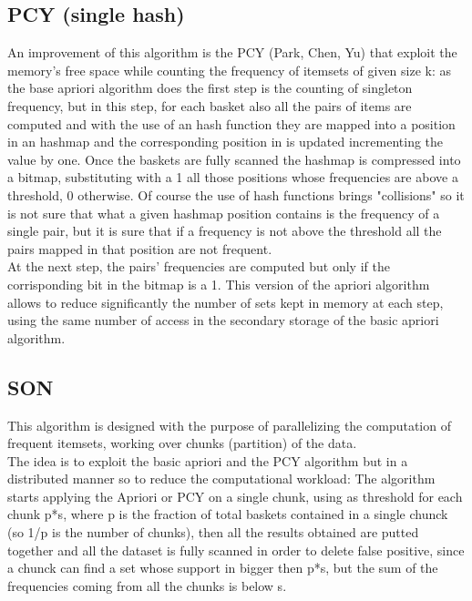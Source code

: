 \documentclass[14pt]{extarticle}
\begin{document}
\subsection{PCY (single hash)}
An improvement of this algorithm is the PCY (Park, Chen, Yu) that exploit the memory's free space while counting the frequency of itemsets of given size k:
as the base apriori algorithm does the first step is the counting of singleton frequency, but in this step, for each basket also all the pairs of items are computed
and with the use of an hash function they are mapped into a position in an hashmap and the corresponding position in is updated incrementing the value by one. Once the baskets are fully scanned the hashmap is compressed into a bitmap, substituting with a 1 all those positions whose frequencies are above a threshold, 0 otherwise. 
Of course the use of hash functions brings "collisions" so it is not sure that what a given hashmap position contains is the frequency of a single pair, but it is sure that if a frequency is not above the threshold all the pairs mapped in that position are not frequent.\\
At the next step, the pairs' frequencies are computed but only if the corrisponding bit in the bitmap is a 1.
This version of the apriori algorithm allows to reduce significantly the number of sets kept in memory at each step, using the same number of access in the secondary storage of the basic apriori algorithm.
 
\subsection{SON}
This algorithm is designed with the purpose of parallelizing the computation of frequent itemsets, working over chunks (partition) of the data.\\
The idea is to exploit the basic apriori and the PCY algorithm but in a distributed manner so to reduce the computational workload:
The algorithm starts applying the Apriori or PCY on a single chunk, using as threshold for each chunk p*s, where p is the fraction of total baskets contained in a single chunck (so 1/p is the number of chunks), then all the results obtained are putted together and all the dataset is fully scanned in order to delete false positive, since a chunck can find a set whose support in bigger then p*s, but the sum of the frequencies coming from all the chunks is below s.
\end{document}
